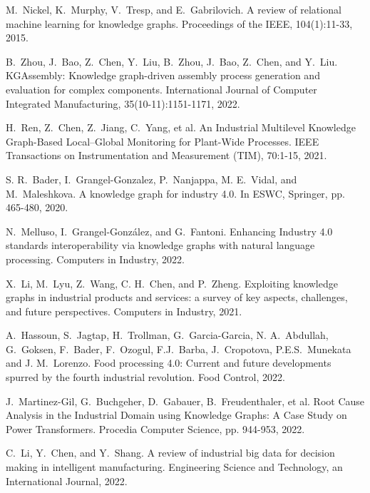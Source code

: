 \documentclass[11pt]{article}
\begin{document}
\begin{thebibliography}{10}
\itemsep=1pt
\begin{small}


 M.~Nickel, K.~Murphy, V.~Tresp, and E.~Gabrilovich. \newblock  A review of relational machine learning for knowledge graphs. \newblock Proceedings of the IEEE, 104(1):11-33, 2015.

 B.~Zhou, J.~Bao, Z.~Chen, Y.~Liu,
B.~Zhou, J.~Bao, Z.~Chen, and Y.~Liu. \newblock KGAssembly: Knowledge graph-driven assembly process generation and evaluation for complex components. \newblock International Journal of Computer Integrated Manufacturing, 35(10-11):1151-1171, 2022.


 H.~Ren, Z.~Chen, Z.~Jiang, C.~Yang, et al. \newblock An Industrial Multilevel Knowledge Graph-Based Local–Global Monitoring for Plant-Wide Processes. \newblock IEEE Transactions on Instrumentation and Measurement (TIM), 70:1-15, 2021.

 S. R.~Bader, I.~Grangel-Gonzalez, P.~Nanjappa, M. E.~Vidal, and M.~Maleshkova. \newblock A knowledge graph for industry 4.0. \newblock In ESWC, Springer, pp. 465-480, 2020.

 N.~Melluso, I.~Grangel-González, and G.~Fantoni. \newblock Enhancing Industry 4.0 standards interoperability via knowledge graphs with natural language processing. \newblock Computers in Industry, 2022.

 X.~Li, M.~Lyu, Z.~Wang, C. H.~Chen, and P.~Zheng. \newblock Exploiting knowledge graphs in industrial products and services: a survey of key aspects, challenges, and future perspectives. \newblock Computers in Industry, 2021.


 A.~Hassoun, S.~Jagtap, H.~Trollman, G.~Garcia-Garcia, N. A.~Abdullah, G.~Goksen, F.~Bader, F.~Ozogul, F.J.~Barba, J.~Cropotova, P.E.S.~Munekata and J. M.~Lorenzo. \newblock Food processing 4.0: Current and future developments spurred by the fourth industrial revolution. \newblock Food Control, 2022.

 J.~Martinez-Gil, G.~Buchgeher, D.~Gabauer, B.~Freudenthaler, et al. \newblock Root Cause Analysis in the Industrial Domain using Knowledge Graphs: A Case Study on Power Transformers. \newblock Procedia Computer Science, pp. 944-953, 2022.

 C.~Li, Y.~Chen, and Y.~Shang. \newblock A review of industrial big data for decision making in intelligent manufacturing. \newblock Engineering Science and Technology, an International Journal, 2022.


\end{small}
\end{thebibliography}
\end{document}
